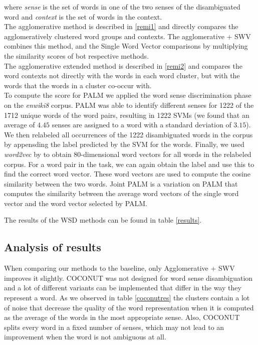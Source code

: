 \documentclass[11pt]{article}
\begin{document}
where \textit{sense} is the set of words in one of the two senses of the disambiguated word and \textit{context} is the set of words in the context.\\
The agglomerative method is described in \ref{remi1} and directly compares the agglomeratively clustered word groups and contexts. The agglomerative + SWV combines this method, and the Single Word Vector comparisons by multiplying the similarity scores of bot respective methods.\\
The agglomerative extended method is described in \ref{remi2} and compares the word contexts not directly with the words in each word cluster, but with the words that the words in a cluster co-occur with.\\
To compute the score for PALM we applied the word sense discrimination phase on the \textit{enwiki8} corpus. PALM was able to identify different senses for 1222 of the 1712 unique words of the word pairs, resulting in 1222 SVMs  (we found that an average of $4.45$ senses are assigned to a word with a standard deviation of $3.15$). We then relabeled all occurrences of the 1222 disambiguated words in the corpus by appensding the label predicted by the SVM for the words. Finally, we used \textit{word2vec} by \cite{word2vec} to obtain 80-dimensional word vectors for all words in the relabeled corpus. For a word pair in the task, we can again obtain the label and use this to find the correct word vector. These word vectors are used to compute the cosine similarity between the two words. Joint PALM is a variation on PALM that computes the similarity between the average word vectors of the single word vector and the word vector selected by PALM.

The results of the WSD methods can be found in table \ref{results}.

\subsection{Analysis of results}
When comparing our methods to the baseline, only Agglomerative + SWV improves it slightly. COCONUT was not designed for word sense disambiguation and a lot of different variants can be implemented that differ in the way they represent a word. As we observed in table \ref{coconutres} the clusters contain a lot of noise that decrease the quality of the word representation when it is computed as the average of the words in the most appropriate sense. Also, COCONUT splits every word in a fixed number of senses, which may not lead to an improvement when the word is not ambiguous at all. 
\end{document}
